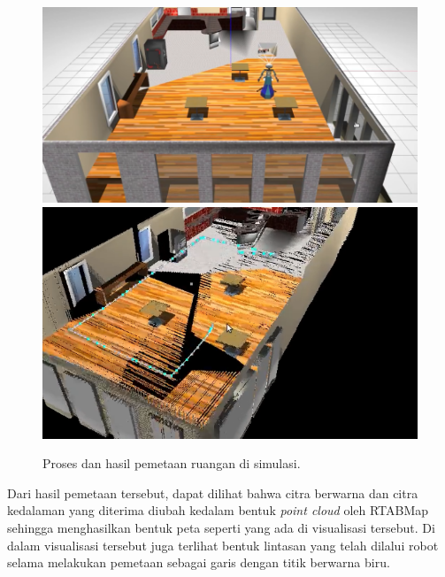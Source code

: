 \begin{figure}[ht]
  \centering
  \includegraphics[height=0.26\textwidth,keepaspectratio]{gambar/proses-pemetaan.png}
  \includegraphics[height=0.26\textwidth,keepaspectratio]{gambar/hasil-pemetaan.png}
  \caption{Proses dan hasil pemetaan ruangan di simulasi.}
  \label{fig:hasilpemetaan}
\end{figure}

Dari hasil pemetaan tersebut,
  dapat dilihat bahwa citra berwarna dan citra kedalaman yang diterima diubah kedalam bentuk \emph{point cloud} oleh RTABMap sehingga menghasilkan bentuk peta seperti yang ada di visualisasi tersebut.
Di dalam visualisasi tersebut juga terlihat bentuk lintasan yang telah dilalui robot selama melakukan pemetaan sebagai garis dengan titik berwarna biru.
